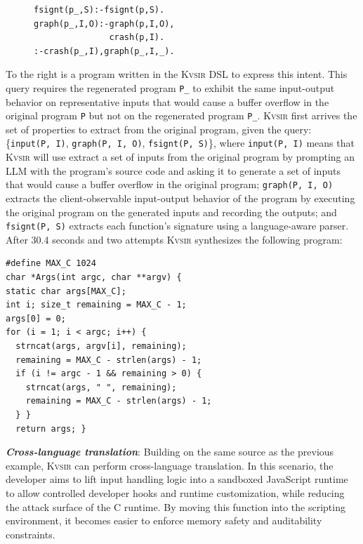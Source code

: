 \documentclass[sigplan,review,anonymous,10pt]{acmart}
\newcommand{\sys}{{\scshape Kv{\textalpha}sir}\xspace}
\newcommand{\heading}[1]{\vspace{2pt}\noindent\textbf{\emph{#1}}:\enspace}
\newcommand{\ttt}[1]{\texttt{#1}\xspace}
\newcommand{\prop}[1]{\setlength{\fboxsep}{1.75pt}\colorbox{lightperiwinkle}{\texttt{#1}}}
\begin{document}
\begin{figure}
\begin{verbatim}
fsignt(p_,S):-fsignt(p,S).
graph(p_,I,O):-graph(p,I,O),
               crash(p,I).
:-crash(p_,I),graph(p_,I,_).
\end{verbatim}
\end{figure}
To the right is a program written in the \sys DSL to express this intent.
This query requires the regenerated program \ttt{P\_} to exhibit the same
input-output behavior on representative inputs that would cause a buffer overflow in the original program \ttt{P}
but not on the regenerated program \ttt{P\_}.
\sys first arrives the set of properties to extract from the
original program, given the query:
\{\prop{input(P, I)}, \prop{graph(P, I, O)}, \prop{fsignt(P, S)}\}, where
\prop{input(P, I)} means that \sys will use extract a set of inputs from the original program
by prompting an LLM with the program's source code and asking it to generate a set of inputs that
would cause a buffer overflow in the original program;
\prop{graph(P, I, O)} extracts the client-observable input-output behavior of the program
by executing the original program on the generated inputs and recording the outputs;
and \prop{fsignt(P, S)} extracts each function's signature using a language-aware parser.
After 30.4 seconds and two attempts \sys synthesizes the following program:
\begin{verbatim}
#define MAX_C 1024
char *Args(int argc, char **argv) {
static char args[MAX_C];
int i; size_t remaining = MAX_C - 1;
args[0] = 0;
for (i = 1; i < argc; i++) {
  strncat(args, argv[i], remaining);
  remaining = MAX_C - strlen(args) - 1;
  if (i != argc - 1 && remaining > 0) {
    strncat(args, " ", remaining);
    remaining = MAX_C - strlen(args) - 1;
  } }
  return args; }
\end{verbatim}

\heading{Cross-language translation}
Building on the same source as the previous example, \sys can perform
cross-language translation.
In this scenario, the developer aims to lift input
handling logic into a sandboxed JavaScript runtime to allow controlled
developer hooks and runtime customization, while reducing the attack surface of
the C runtime.
By moving this function into the scripting environment, it
becomes easier to enforce memory safety and auditability constraints.
\end{document}
